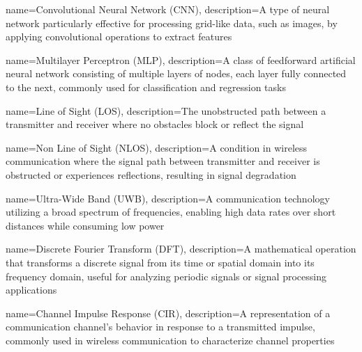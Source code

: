 
{
    name={Convolutional Neural Network (CNN)},
    description={A type of neural network particularly effective for processing grid-like data, such as images, by applying convolutional operations to extract features}
}

{
    name={Multilayer Perceptron (MLP)},
    description={A class of feedforward artificial neural network consisting of multiple layers of nodes, each layer fully connected to the next, commonly used for classification and regression tasks}
}

{
    name={Line of Sight (LOS)},
    description={The unobstructed path between a transmitter and receiver where no obstacles block or reflect the signal}
}

{
    name={Non Line of Sight (NLOS)},
    description={A condition in wireless communication where the signal path between transmitter and receiver is obstructed or experiences reflections, resulting in signal degradation}
}

{
    name={Ultra-Wide Band (UWB)},
    description={A communication technology utilizing a broad spectrum of frequencies, enabling high data rates over short distances while consuming low power}
}

{
    name={Discrete Fourier Transform (DFT)},
    description={A mathematical operation that transforms a discrete signal from its time or spatial domain into its frequency domain, useful for analyzing periodic signals or signal processing applications}
}

{
    name={Channel Impulse Response (CIR)},
    description={A representation of a communication channel's behavior in response to a transmitted impulse, commonly used in wireless communication to characterize channel properties}
}
